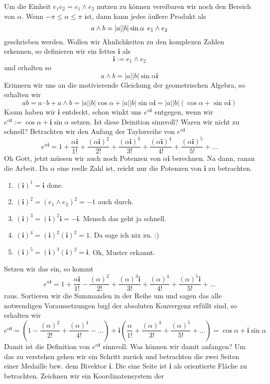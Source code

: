 \documentclass[fleqn]{scrartcl}
\numberwithin{equation}{section}
\def\*#1{\mathbf{#1}}
\begin{document}
Um die Einheit $e_1e_2 = e_1\wedge e_2$ nutzen zu können vereibaren wir noch
den Bereich von $\alpha$. Wenn $-\pi\leq\alpha\leq\pi$ ist, dann kann jedes
äußere Produkt als
\[a\wedge b= |a||b|\sin\alpha \hspace{1ex} e_1\wedge e_2\]
geschrieben werden. Wollen wir Ähnlichkeiten zu den komplexen Zahlen erkennen,
so definieren wir ein fettes $\*i$ als
\[\*i:= e_1\wedge e_2\]
und erhalten so
\[a\wedge b= |a||b|\sin\alpha\*i\]
Erinnern wir uns an die motivierende Gleichung der geometrischen Algebra, so
erhalten wir
\[ab=a\cdot b + a\wedge b = |a||b|\cos\alpha + |a||b|\sin\alpha\*i =
|a||b|(\cos\alpha + \sin\alpha\*i)\]
Kaum haben wir $\*i$ entdeckt, schon winkt uns $e^{\alpha\*i}$ entgegen, wenn
wir $e^{\alpha\*i} := \cos\alpha + \*i\sin\alpha$ setzen. Ist diese Deinition
sinnvoll? Waren wir nicht zu schnell? Betrachten wir den Anfang der
Taylorreihe von $e^{\alpha\*i}$
\[e^{\alpha\*i}=1+\frac{\alpha\*i}{1!}+\frac{(\alpha\*i)^2}{2!}
+\frac{(\alpha\*i)^3}{3!}+\frac{(\alpha\*i)^4}{4!}+\frac{(\alpha\*i)^5}{5!}+ ...\]
Oh Gott, jetzt müssen wir auch noch Potenzen von $\alpha\*i$ berechnen. Na
dann, ranan die Arbeit. Da $\alpha$ eine reelle Zahl ist, reicht nur die
Potenzen von $\*i$ zu betrachten.
\begin{enumerate}
    \item $(\*i)^1=\*i$ done.
    \item $(\*i)^2=(e_1\wedge e_2)^2=-1$ auch durch.
    \item $(\*i)^3 = (\*i)^2\*i = -\*i$. Mensch das geht ja schnell.
    \item $(\*i)^4=(\*i)^2(\*i)^2=1$. Da sage ich nix zu. :)
    \item $(\*i)^5=(\*i)^3(\*i)^2=\*i$. Ok, Muster erkannt.
\end{enumerate}
Setzen wir das ein, so kommt
\[e^{\alpha\*i}=1+\frac{\alpha\*i}{1!}-\frac{(\alpha)^2}{2!}
+\frac{(\alpha)^3\*i}{3!}+\frac{(\alpha)^4}{4!}+\frac{(\alpha)^5\*i}{5!}+ ...\]
raus. Sortieren wir die Summanden in der Reihe um und sagen das alle
notwendigen Voraussetzungen bzgl der absoluten Konvergenz erfüllt sind, so
erhalten wir
\[e^{\alpha\*i}=\left(1-\frac{(\alpha)^2}{2!}+\frac{(\alpha)^4}{4!}-...\right)
+\*i\left(\frac{\alpha}{1!}+\frac{(\alpha)^3}{3!}+\frac{(\alpha)^5}{5!}+
...\right)=\cos\alpha+\*i\sin\alpha\]
Damit ist die Definition von $e^{\alpha\*i}$ sinnvoll. Was können wir damit
anfangen? Um das zu verstehen gehen wir ein Schritt zurück und betrachten die
zwei Seiten einer Medaille bzw. dem Bivektor $\*i$. Die eine Seite ist $\*i$
als orientierte Fläche zu betrachten. Zeichnen wir ein Koordinatensystem der
\end{document}
